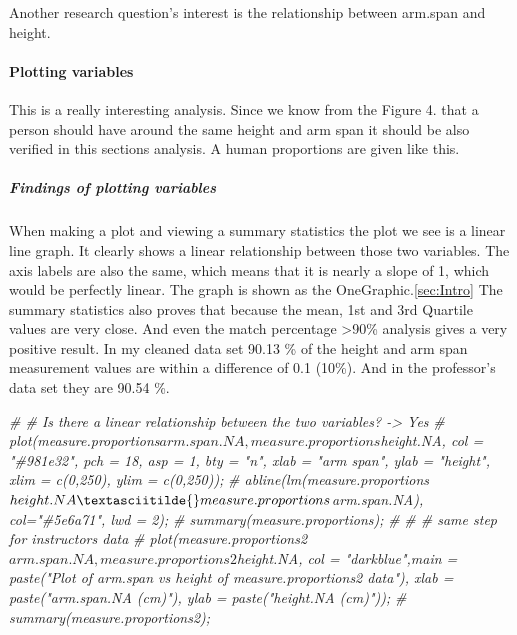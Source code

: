 \documentclass[]{article}
\newenvironment{Shaded}{\begin{snugshade}}{\end{snugshade}}
\newcommand{\CommentTok}[1]{\textcolor[rgb]{0.56,0.35,0.01}{\textit{#1}}}
\begin{document}
Another research question's interest is the relationship between
arm.span and height.

\paragraph{Plotting variables}
\label{sec:appendix-plotting-variables}

This is a really interesting analysis. Since we know from the Figure 4.
that a person should have around the same height and arm span it should
be also verified in this sections analysis. A human proportions are
given like this.

\subparagraph{Findings of plotting variables}
\label{sec:appendix-findings-plotting}

When making a plot and viewing a summary statistics the plot we see is a
linear line graph. It clearly shows a linear relationship between those
two variables. The axis labels are also the same, which means that it is
nearly a slope of 1, which would be perfectly linear. The graph is shown
as the OneGraphic.\ref{sec:Intro} The summary statistics also proves
that because the mean, 1st and 3rd Quartile values are very close. And
even the match percentage \textgreater90\% analysis gives a very
positive result. In my cleaned data set 90.13 \% of the height and arm
span measurement values are within a difference of 0.1 (10\%). And in
the professor's data set they are 90.54 \%.

\begin{Shaded}
\begin{Highlighting}[]
\CommentTok{\# \# Is there a linear relationship between the two variables? {-}\textgreater{} Yes}
\CommentTok{\# plot(measure.proportions$arm.span.NA, measure.proportions$height.NA, col = "\#981e32", pch = 18, asp = 1, bty = "n", xlab = "arm span", ylab = "height", xlim = c(0,250), ylim = c(0,250));}
\CommentTok{\# abline(lm(measure.proportions$height.NA\textasciitilde{}measure.proportions$arm.span.NA), col="\#5e6a71", lwd = 2);}
\CommentTok{\# summary(measure.proportions);}
\CommentTok{\# }
\CommentTok{\# \# same step for instructors data}
\CommentTok{\# plot(measure.proportions2$arm.span.NA, measure.proportions2$height.NA, col = "darkblue",main = paste("Plot of arm.span vs height of measure.proportions2 data"), xlab = paste("arm.span.NA (cm)"), ylab = paste("height.NA (cm)"));}
\CommentTok{\# summary(measure.proportions2);}
\end{Highlighting}
\end{Shaded}
\end{document}
